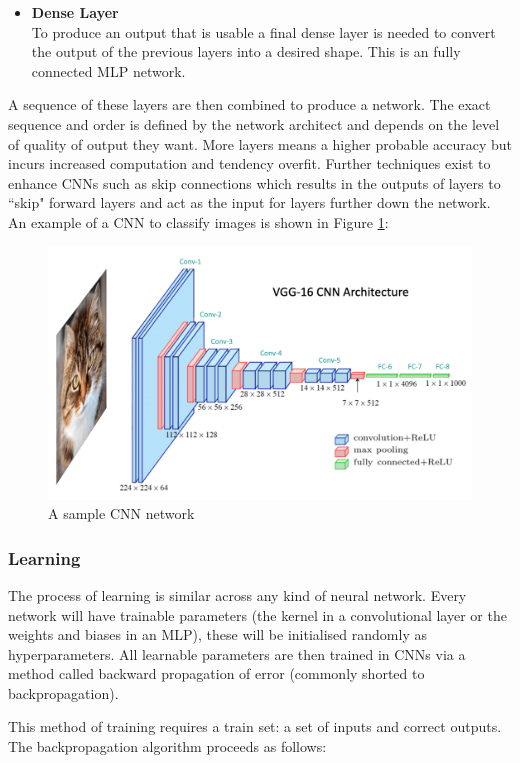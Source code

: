 \begin{itemize}
    \item \textbf{Dense Layer}\\
    To produce an output that is usable a final dense layer is needed to convert the output of the previous layers into a desired shape. This is an fully connected MLP network.
\end{itemize}

A sequence of these layers are then combined to produce a network. The exact sequence and order is defined by the network architect and depends on the level of quality of output they want. More layers means a higher probable accuracy but incurs increased computation and tendency overfit. Further techniques exist to enhance CNNs such as skip connections which results in the outputs of layers to ``skip" forward layers and act as the input for layers further down the network. An example of a CNN to classify images is shown in Figure \ref{fig:sample-cnn}:

\begin{figure}[H]
    \centering
    \includegraphics[width=0.5\linewidth]{dissertation//figures/sample-cnn.png}
    \caption{A sample CNN network\cite{kromydas2023convolutional}}
    \label{fig:sample-cnn}
\end{figure}

\subsubsection{Learning}

The process of learning is similar across any kind of neural network. Every network will have trainable parameters (the kernel in a convolutional layer or the weights and biases in an MLP), these will be initialised randomly as hyperparameters. All learnable parameters are then trained in CNNs via a method called backward propagation of error (commonly shorted to backpropagation)\cite{rojas2013neural}.

This method of training requires a train set: a set of inputs and correct outputs. The backpropagation algorithm proceeds as follows:

